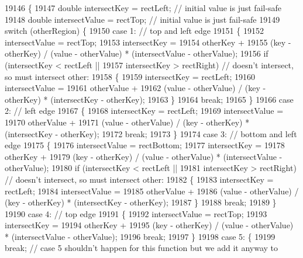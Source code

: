 \begin{DoxyCode}
19146                                                                                \{
19147   \textcolor{keywordtype}{double} intersectKey = rectLeft;  \textcolor{comment}{// initial value is just fail-safe}
19148   \textcolor{keywordtype}{double} intersectValue = rectTop; \textcolor{comment}{// initial value is just fail-safe}
19149   \textcolor{keywordflow}{switch} (otherRegion) \{
19150   \textcolor{keywordflow}{case} 1: \textcolor{comment}{// top and left edge}
19151   \{
19152     intersectValue = rectTop;
19153     intersectKey =
19154         otherKey +
19155         (key - otherKey) / (value - otherValue) * (intersectValue - otherValue);
19156     \textcolor{keywordflow}{if} (intersectKey < rectLeft ||
19157         intersectKey > rectRight) \textcolor{comment}{// doesn't intersect, so must intersect other:}
19158     \{
19159       intersectKey = rectLeft;
19160       intersectValue =
19161           otherValue +
19162           (value - otherValue) / (key - otherKey) * (intersectKey - otherKey);
19163     \}
19164     \textcolor{keywordflow}{break};
19165   \}
19166   \textcolor{keywordflow}{case} 2: \textcolor{comment}{// left edge}
19167   \{
19168     intersectKey = rectLeft;
19169     intersectValue =
19170         otherValue +
19171         (value - otherValue) / (key - otherKey) * (intersectKey - otherKey);
19172     \textcolor{keywordflow}{break};
19173   \}
19174   \textcolor{keywordflow}{case} 3: \textcolor{comment}{// bottom and left edge}
19175   \{
19176     intersectValue = rectBottom;
19177     intersectKey =
19178         otherKey +
19179         (key - otherKey) / (value - otherValue) * (intersectValue - otherValue);
19180     \textcolor{keywordflow}{if} (intersectKey < rectLeft ||
19181         intersectKey > rectRight) \textcolor{comment}{// doesn't intersect, so must intersect other:}
19182     \{
19183       intersectKey = rectLeft;
19184       intersectValue =
19185           otherValue +
19186           (value - otherValue) / (key - otherKey) * (intersectKey - otherKey);
19187     \}
19188     \textcolor{keywordflow}{break};
19189   \}
19190   \textcolor{keywordflow}{case} 4: \textcolor{comment}{// top edge}
19191   \{
19192     intersectValue = rectTop;
19193     intersectKey =
19194         otherKey +
19195         (key - otherKey) / (value - otherValue) * (intersectValue - otherValue);
19196     \textcolor{keywordflow}{break};
19197   \}
19198   \textcolor{keywordflow}{case} 5: \{
19199     \textcolor{keywordflow}{break}; \textcolor{comment}{// case 5 shouldn't happen for this function but we add it anyway to}

\end{DoxyCode}
